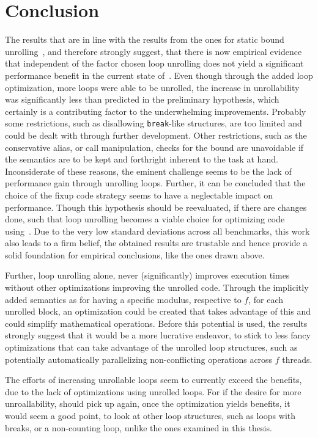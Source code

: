 \chapter{Conclusion}\label{sec:conclusion}

The results that are in line with the results from the ones for static bound unrolling~\cite{aebi18bachelorarbeit}, and therefore strongly suggest, that there is now empirical evidence that independent of the factor chosen loop unrolling does not yield a significant performance benefit in the current state of~\libFIRM.
Even though through the added loop optimization, more loops were able to be unrolled, the increase in unrollability was significantly less than predicted in the preliminary hypothesis, which certainly is a contributing factor to the underwhelming improvements.
Probably some restrictions, such as disallowing \texttt{break}-like structures, are too limited and could be dealt with through further development.
Other restrictions, such as the conservative alias, or call manipulation, checks for the bound are unavoidable if the semantics are to be kept and forthright inherent to the task at hand.
Inconsiderate of these reasons, the eminent challenge seems to be the lack of performance gain through unrolling loops.
Further, it can be concluded that the choice of the fixup code strategy seems to have a neglectable impact on performance.
Though this hypothesis should be reevaluated, if there are changes done, such that loop unrolling becomes a viable choice for optimizing code using~\libFIRM.
Due to the very low standard deviations across all benchmarks, this work also leads to a firm belief, the obtained results are trustable and hence provide a solid foundation for empirical conclusions, like the ones drawn above.

Further, loop unrolling alone, never (significantly) improves execution times without other optimizations improving the unrolled code.
Through the implicitly added semantics as for having a specific modulus, respective to $f$, for each unrolled block, an optimization could be created that takes advantage of this and could simplify mathematical operations.
Before this potential is used, the results strongly suggest that it would be a more lucrative endeavor, to stick to less fancy optimizations that can take advantage of the unrolled loop structures, such as potentially automatically parallelizing non-conflicting operations across $f$ threads.

The efforts of increasing unrollable loops seem to currently exceed the benefits, due to the lack of optimizations using unrolled loops.
For if the desire for more unroallability, should pick up again, once the optimization yields benefits, it would seem a good point, to look at other loop structures, such as loops with breaks, or a non-counting loop, unlike the ones examined in this thesis.
